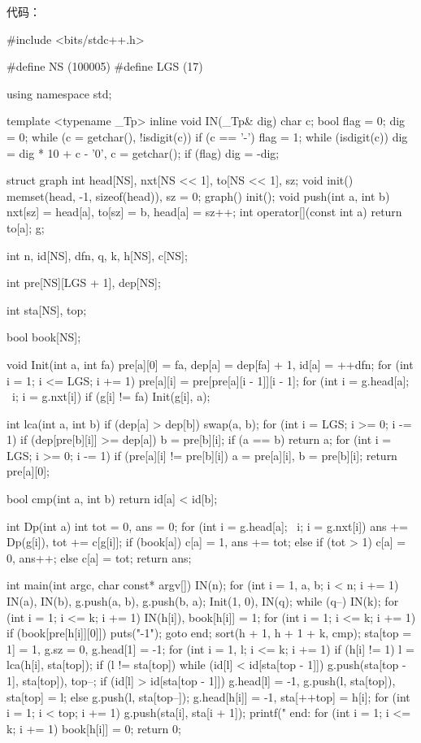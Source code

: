 {代码：

\begin{cppcode}
#include <bits/stdc++.h>

#define NS (100005)
#define LGS (17)

using namespace std;

template <typename _Tp>
inline void IN(_Tp& dig) {
  char c;
  bool flag = 0;
  dig = 0;
  while (c = getchar(), !isdigit(c))
    if (c == '-') flag = 1;
  while (isdigit(c)) dig = dig * 10 + c - '0', c = getchar();
  if (flag) dig = -dig;
}

struct graph {
  int head[NS], nxt[NS << 1], to[NS << 1], sz;
  void init() { memset(head, -1, sizeof(head)), sz = 0; }
  graph() { init(); }
  void push(int a, int b) { nxt[sz] = head[a], to[sz] = b, head[a] = sz++; }
  int operator[](const int a) { return to[a]; }
} g;

int n, id[NS], dfn, q, k, h[NS], c[NS];

int pre[NS][LGS + 1], dep[NS];

int sta[NS], top;

bool book[NS];

void Init(int a, int fa) {
  pre[a][0] = fa, dep[a] = dep[fa] + 1, id[a] = ++dfn;
  for (int i = 1; i <= LGS; i += 1) pre[a][i] = pre[pre[a][i - 1]][i - 1];
  for (int i = g.head[a]; ~i; i = g.nxt[i])
    if (g[i] != fa) Init(g[i], a);
}

int lca(int a, int b) {
  if (dep[a] > dep[b]) swap(a, b);
  for (int i = LGS; i >= 0; i -= 1)
    if (dep[pre[b][i]] >= dep[a]) b = pre[b][i];
  if (a == b) return a;
  for (int i = LGS; i >= 0; i -= 1)
    if (pre[a][i] != pre[b][i]) a = pre[a][i], b = pre[b][i];
  return pre[a][0];
}

bool cmp(int a, int b) { return id[a] < id[b]; }

int Dp(int a) {
  int tot = 0, ans = 0;
  for (int i = g.head[a]; ~i; i = g.nxt[i]) ans += Dp(g[i]), tot += c[g[i]];
  if (book[a])
    c[a] = 1, ans += tot;
  else if (tot > 1)
    c[a] = 0, ans++;
  else
    c[a] = tot;
  return ans;
}

int main(int argc, char const* argv[]) {
  IN(n);
  for (int i = 1, a, b; i < n; i += 1) IN(a), IN(b), g.push(a, b), g.push(b, a);
  Init(1, 0), IN(q);
  while (q--) {
    IN(k);
    for (int i = 1; i <= k; i += 1) IN(h[i]), book[h[i]] = 1;
    for (int i = 1; i <= k; i += 1)
      if (book[pre[h[i]][0]]) {
        puts("-1");
        goto end;
      }
    sort(h + 1, h + 1 + k, cmp);
    sta[top = 1] = 1, g.sz = 0, g.head[1] = -1;
    for (int i = 1, l; i <= k; i += 1)
      if (h[i] != 1) {
        l = lca(h[i], sta[top]);
        if (l != sta[top]) {
          while (id[l] < id[sta[top - 1]])
            g.push(sta[top - 1], sta[top]), top--;
          if (id[l] > id[sta[top - 1]])
            g.head[l] = -1, g.push(l, sta[top]), sta[top] = l;
          else
            g.push(l, sta[top--]);
        }
        g.head[h[i]] = -1, sta[++top] = h[i];
      }
    for (int i = 1; i < top; i += 1) g.push(sta[i], sta[i + 1]);
    printf("%
  end:
    for (int i = 1; i <= k; i += 1) book[h[i]] = 0;
  }
  return 0;
}
\end{cppcode}

}
